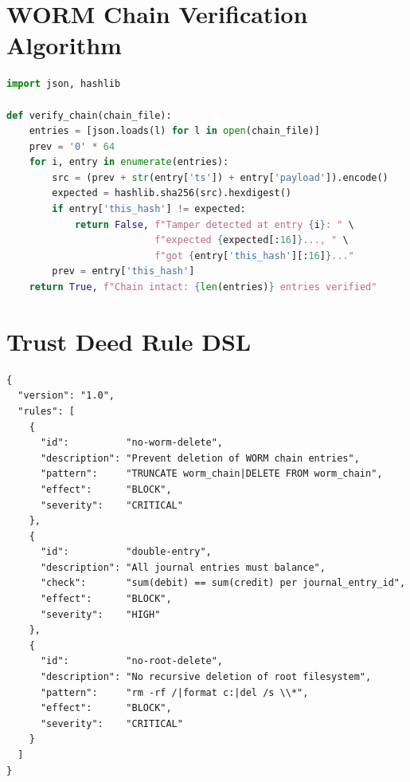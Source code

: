 \documentclass[12pt,letterpaper]{article}
\begin{document}
\newpage



\appendix

\section{WORM Chain Verification Algorithm}
\label{app:verify}

\begin{lstlisting}[language=Python, caption={Chain verification procedure}]
import json, hashlib

def verify_chain(chain_file):
    entries = [json.loads(l) for l in open(chain_file)]
    prev = '0' * 64
    for i, entry in enumerate(entries):
        src = (prev + str(entry['ts']) + entry['payload']).encode()
        expected = hashlib.sha256(src).hexdigest()
        if entry['this_hash'] != expected:
            return False, f"Tamper detected at entry {i}: " \
                          f"expected {expected[:16]}..., " \
                          f"got {entry['this_hash'][:16]}..."
        prev = entry['this_hash']
    return True, f"Chain intact: {len(entries)} entries verified"
\end{lstlisting}

\section{Trust Deed Rule DSL}
\label{app:trustdeed}

\begin{lstlisting}[language={},caption={Trust Deed governance rule format (JSON)}]
{
  "version": "1.0",
  "rules": [
    {
      "id":          "no-worm-delete",
      "description": "Prevent deletion of WORM chain entries",
      "pattern":     "TRUNCATE worm_chain|DELETE FROM worm_chain",
      "effect":      "BLOCK",
      "severity":    "CRITICAL"
    },
    {
      "id":          "double-entry",
      "description": "All journal entries must balance",
      "check":       "sum(debit) == sum(credit) per journal_entry_id",
      "effect":      "BLOCK",
      "severity":    "HIGH"
    },
    {
      "id":          "no-root-delete",
      "description": "No recursive deletion of root filesystem",
      "pattern":     "rm -rf /|format c:|del /s \\*",
      "effect":      "BLOCK",
      "severity":    "CRITICAL"
    }
  ]
}
\end{lstlisting}
\end{document}
